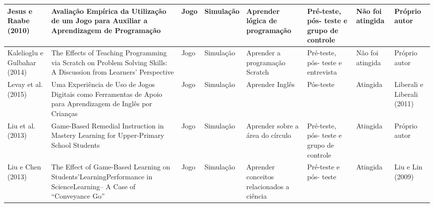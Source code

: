 \begin{table}
{\begin{tabular}{|L|m{5cm}|L|L|m{2.5cm}|m{2cm}|L|L|}
Jesus e Raabe (2010)           & Avaliação Empírica da Utilização de um Jogo para Auxiliar a Aprendizagem de Programação                                                                                                                & Jogo                  & Simulação           & Aprender lógica de programação                                             & Pré-teste, pós- teste e grupo de controle                           & Não foi atingida       & Próprio autor                                           \\ \hline
Kalelioglu e Gulbahar (2014)   & The Effects of Teaching Programming via Scratch on Problem Solving Skills: A Discussion from Learners’ Perspective                                                                                     & Jogo                  & Simulação           & Aprender a programação Scratch                                             & Pré-teste, pós- teste e entrevista                                  & Não foi atingida       & Próprio autor                                           \\ \hline
Levay et al. (2015)            & Uma Experiência de Uso de Jogos Digitais como Ferramentas de Apoio para Aprendizagem de Inglês por Crianças                                                                                            & Jogo                  & Simulação           & Aprender Inglês                                                            & Pós-teste                                                           & Atingida               & Liberali e Liberali (2011)                              \\ \hline
Liu et al. (2013)              & Game-Based Remedial Instruction in Mastery Learning for Upper-Primary School Students                                                                                                                  & Jogo                  & Simulação           & Aprender sobre a área do círculo                                           & Pré-teste, pós- teste e grupo de controle                           & Atingida               & Próprio autor                                           \\ \hline
Liu e Chen (2013)              & The Effect of Game-Based Learning on Students’LearningPerformance in ScienceLearning– A Case of “Conveyance Go”                                                                                        & Jogo                  & Simulação           & Aprender conceitos relacionados a ciência                                  & Pré-teste e pós- teste                                              & Atingida               & Liu e Lin (2009)                                        \\ \hline

\end{tabular}}
\end{table}
